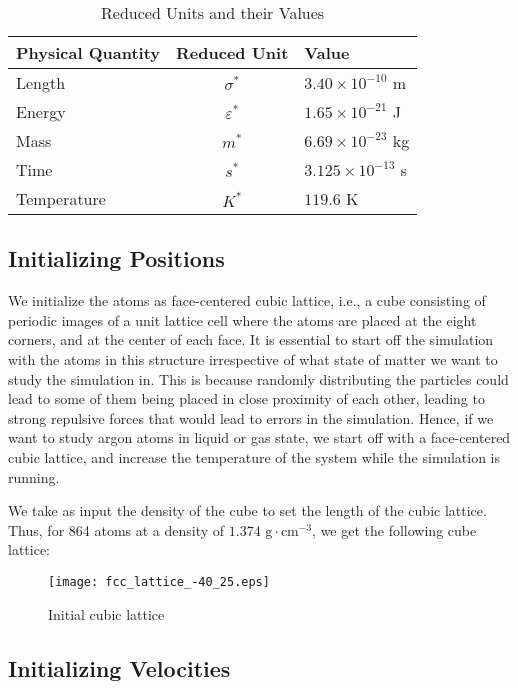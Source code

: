\documentclass[../Main.tex]{subfiles}
\begin{document}
\begin{table}[H]
	\centering
	\begin{tabular}{ |l|c|l| }
		\hline
		Physical Quantity & Reduced Unit & Value \\
		\hline
		Length & $\sigma^{*}$ & $3.40 \times 10^{-10}$ m \\
		Energy & $\varepsilon^{*}$ & $1.65 \times 10^{-21}$ J \\
		Mass & $m^{*}$ & $ 6.69 \times 10^{-23}$ kg\\
		Time & $s^{*}$ & $3.125 \times 10^{-13}$ s \\
		Temperature & $K^{*}$ & $119.6$ K \\
		\hline
	\end{tabular}
	\caption{Reduced Units and their Values}
	\label{tbl:reduced_units}
\end{table}

\subsection{Initializing Positions}

We initialize the atoms as face-centered cubic lattice, i.e., a cube consisting of periodic images of a unit lattice cell where the atoms are placed at the eight corners, and at the center of each face. It is essential to start off the simulation with the atoms in this structure irrespective of what state of matter we want to study the simulation in. This is because randomly distributing the particles could lead to some of them being placed in close proximity of each other, leading to strong repulsive forces that would lead to errors in the simulation. Hence, if we want to study argon atoms in liquid or gas state, we start off with a face-centered cubic lattice, and increase the temperature of the system while the simulation is running.

We take as input the density of the cube to set the length of the cubic lattice. Thus, for 864 atoms at a density of $1.374 \mbox{ g}\cdot\mbox{cm}^{-3}$, we get the following cube lattice:
 
\begin{figure}[H]
\centering
	\texttt{[image: fcc\_lattice\_-40\_25.eps]}
  	\caption{Initial cubic lattice}
	\label{fig:initial_cubic_lattice}
\end{figure}

\subsection{Initializing Velocities}
\end{document}
